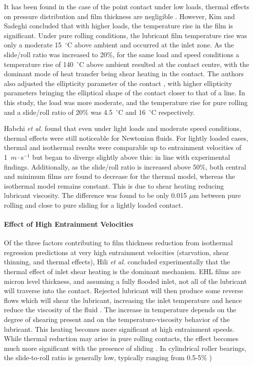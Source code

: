 It has been found in the case of the point contact under low loads, thermal effects on pressure distribution and film thickness are negligible \cite{ZhuDong1984}. However, Kim and Sadeghi \cite{Kim1993} concluded that with higher loads, the temperature rise in the film is significant. Under pure rolling conditions, the lubricant film temperature rise was only a moderate 15~${ }^{\circ}\mathrm{C}$ above ambient and occurred at the inlet zone. As the slide/roll ratio was increased to 20\%, for the same load and speed conditions a temperature rise of 140~${ }^{\circ}\mathrm{C}$ above ambient resulted at the contact centre, with the dominant mode of heat transfer being shear heating in the contact. The authors also adjusted the ellipticity parameter of the contact \cite{Kim1993a}, with higher ellipticity parameters bringing the elliptical shape of the contact closer to that of a line. In this study, the load was more moderate, and the temperature rise for pure rolling and a slide/roll ratio of 20\% was 4.5~${ }^{\circ}\mathrm{C}$ and 16~${ }^{\circ}\mathrm{C}$ respectively.

Habchi \textit{et al.} \cite{Habchi2008} found that even under light loads and moderate speed conditions, thermal effects were still noticeable for Newtonian fluids. For lightly loaded cases, thermal and isothermal results were comparable up to entrainment velocities of 1~$m \cdot \mathrm{s}^{-1}$ but began to diverge slightly above this: in line with experimental findings. Additionally, as the slide/roll ratio is increased above 50\%, both central and minimum films are found to decrease for the thermal model, whereas the isothermal model remains constant. This is due to shear heating reducing lubricant viscosity. The difference was found to be only 0.015 $\mu \mathrm{m}$ between pure rolling and close to pure sliding for a lightly loaded contact.

\paragraph{Effect of High Entrainment Velocities}
Of the three factors contributing to film thickness reduction from isothermal regression predictions at very high entrainment velocities (starvation, shear thinning, and thermal effects), Hili \textit{et al.} \cite{Hili2010} concluded experimentally  that the thermal effect of inlet shear heating is the dominant mechanism. EHL films are micron level thickness, and assuming a fully flooded inlet, not all of the lubricant will traverse into the contact. Rejected lubricant will then produce some reverse flows which will shear the lubricant, increasing the inlet temperature and hence reduce the viscosity of the fluid \cite{Greenwood1973}. The increase in temperature depends on the degree of shearing present and on the temperature-viscosity behavior of the lubricant. This heating becomes more significant at high entrainment speeds. While thermal reduction may arise in pure rolling contacts, the effect becomes much more significant with the presence of sliding \cite{Gohar1988}. In cylindrical roller bearings, the slide-to-roll ratio is generally low, typically ranging from 0.5-5\% \cite{Hui2018})

